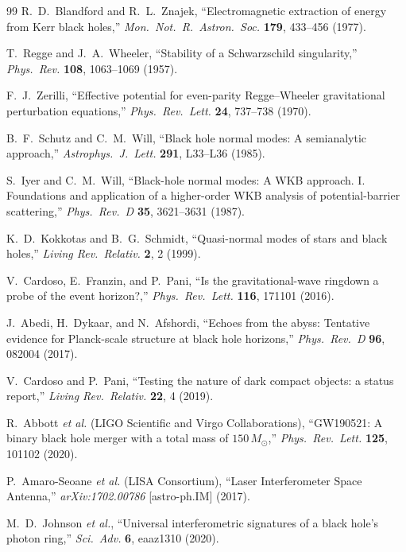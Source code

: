 \documentclass[11pt,a4paper]{article}
\theoremstyle{plain}
\theoremstyle{definition}
\theoremstyle{remark}
\numberwithin{equation}{section}
\begin{document}
\begin{thebibliography}{99}
R.~D.~Blandford and R.~L.~Znajek, ``Electromagnetic extraction of energy from Kerr black holes,'' \textit{Mon.\ Not.\ R.\ Astron.\ Soc.} \textbf{179}, 433--456 (1977).

T.~Regge and J.~A.~Wheeler, ``Stability of a Schwarzschild singularity,'' \textit{Phys.\ Rev.} \textbf{108}, 1063--1069 (1957).

F.~J.~Zerilli, ``Effective potential for even-parity Regge--Wheeler gravitational perturbation equations,'' \textit{Phys.\ Rev.\ Lett.} \textbf{24}, 737--738 (1970).

B.~F.~Schutz and C.~M.~Will, ``Black hole normal modes: A semianalytic approach,'' \textit{Astrophys.\ J.\ Lett.} \textbf{291}, L33--L36 (1985).

S.~Iyer and C.~M.~Will, ``Black-hole normal modes: A WKB approach. I. Foundations and application of a higher-order WKB analysis of potential-barrier scattering,'' \textit{Phys.\ Rev.\ D} \textbf{35}, 3621--3631 (1987).

K.~D.~Kokkotas and B.~G.~Schmidt, ``Quasi-normal modes of stars and black holes,'' \textit{Living Rev.\ Relativ.} \textbf{2}, 2 (1999).

V.~Cardoso, E.~Franzin, and P.~Pani, ``Is the gravitational-wave ringdown a probe of the event horizon?,'' \textit{Phys.\ Rev.\ Lett.} \textbf{116}, 171101 (2016).

J.~Abedi, H.~Dykaar, and N.~Afshordi, ``Echoes from the abyss: Tentative evidence for Planck-scale structure at black hole horizons,'' \textit{Phys.\ Rev.\ D} \textbf{96}, 082004 (2017).

V.~Cardoso and P.~Pani, ``Testing the nature of dark compact objects: a status report,'' \textit{Living Rev.\ Relativ.} \textbf{22}, 4 (2019).

R.~Abbott \textit{et al.} (LIGO Scientific and Virgo Collaborations), ``GW190521: A binary black hole merger with a total mass of $150\,M_\odot$,'' \textit{Phys.\ Rev.\ Lett.} \textbf{125}, 101102 (2020).

P.~Amaro-Seoane \textit{et al.} (LISA Consortium), ``Laser Interferometer Space Antenna,'' \textit{arXiv:1702.00786} [astro-ph.IM] (2017).

M.~D.~Johnson \textit{et al.}, ``Universal interferometric signatures of a black hole's photon ring,'' \textit{Sci.\ Adv.} \textbf{6}, eaaz1310 (2020).


\end{thebibliography}
\end{document}
